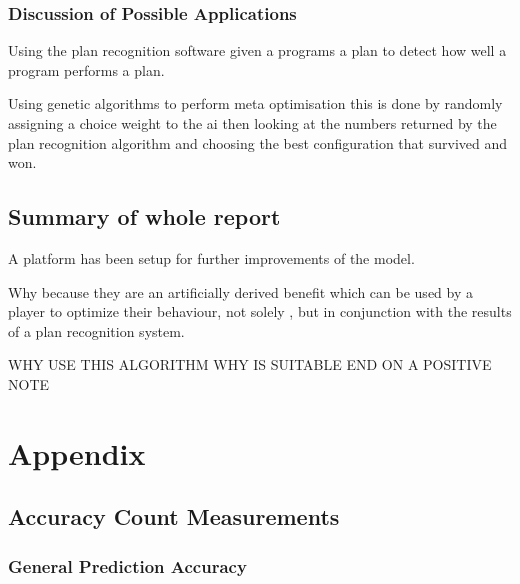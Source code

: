 \documentclass[parskip]{cs4rep}
\begin{document}
\subsection{Discussion of Possible Applications}

Using the plan recognition software given a programs a plan to detect how well a program performs a plan. 

Using genetic algorithms to perform meta optimisation this is done by randomly assigning a choice weight to the ai then looking at the numbers returned by the plan recognition algorithm and choosing the best configuration that survived and won.

\section{Summary of whole report}

A platform has been setup for further improvements of the model.

Why because they are an artificially derived benefit which can be used by a player to optimize their behaviour, not solely , but in conjunction with the results of a plan recognition system.

WHY USE THIS ALGORITHM WHY IS SUITABLE END ON A POSITIVE NOTE

\chapter{Appendix}

\section{Accuracy Count Measurements}

\subsection{General Prediction Accuracy}
\end{document}
